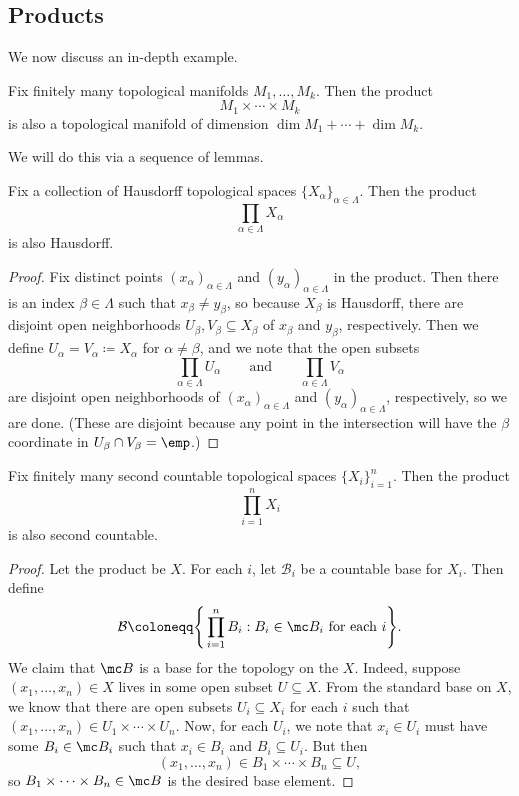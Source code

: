 \documentclass[../notes.tex]{subfiles}
\begin{document}
\subsection{Products}
We now discuss an in-depth example.
\begin{proposition} \label{prop:product-manifold}
	Fix finitely many topological manifolds $M_1,\ldots,M_k$. Then the product
	\[M_1\times\cdots\times M_k\]
	is also a topological manifold of dimension $\dim M_1+\cdots+\dim M_k$.
\end{proposition}
We will do this via a sequence of lemmas.
\begin{lemma} \label{lem:prod-haus}
	Fix a collection of Hausdorff topological spaces $\{X_\alpha\}_{\alpha\in\Lambda}$. Then the product
	\[\prod_{\alpha\in\Lambda}X_\alpha\]
	is also Hausdorff.
\end{lemma}
\begin{proof}
	Fix distinct points $(x_\alpha)_{\alpha\in\Lambda}$ and $(y_\alpha)_{\alpha\in\Lambda}$ in the product. Then there is an index $\beta\in\Lambda$ such that $x_\beta\ne y_\beta$, so because $X_\beta$ is Hausdorff, there are disjoint open neighborhoods $U_\beta,V_\beta\subseteq X_\beta$ of $x_\beta$ and $y_\beta$, respectively. Then we define $U_\alpha=V_\alpha\coloneqq X_\alpha$ for $\alpha\ne\beta$, and we note that the open subsets
	\[\prod_{\alpha\in\Lambda}U_\alpha\qquad\text{and}\qquad\prod_{\alpha\in\Lambda}V_\alpha\]
	are disjoint open neighborhoods of $(x_\alpha)_{\alpha\in\Lambda}$ and $(y_\alpha)_{\alpha\in\Lambda}$, respectively, so we are done. (These are disjoint because any point in the intersection will have the $\beta$ coordinate in $U_\beta\cap V_\beta=\emp$.)
\end{proof}
\begin{lemma} \label{lem:prod-sec-cont}
	Fix finitely many second countable topological spaces $\{X_i\}_{i=1}^n$. Then the product
	\[\prod_{i=1}^nX_i\]
	is also second countable.
\end{lemma}
\begin{proof}
	Let the product be $X$. For each $i$, let $\mathcal B_i$ be a countable base for $X_i$. Then define
	\[\mathcal B\coloneqq\Bigg\{\prod_{i=1}^nB_i:B_i\in\mc B_i\text{ for each }i\Bigg\}.\]
	We claim that $\mc B$ is a base for the topology on the $X$. Indeed, suppose $(x_1,\ldots,x_n)\in X$ lives in some open subset $U\subseteq X$. From the standard base on $X$, we know that there are open subsets $U_i\subseteq X_i$ for each $i$ such that $(x_1,\ldots,x_n)\in U_1\times\cdots\times U_n$. Now, for each $U_i$, we note that $x_i\in U_i$ must have some $B_i\in\mc B_i$ such that $x_i\in B_i$ and $B_i\subseteq U_i$. But then
	\[(x_1,\ldots,x_n)\in B_1\times\cdots\times B_n\subseteq U,\]
	so $B_1\times\cdots\times B_n\in\mc B$ is the desired base element.
\end{proof}
\end{document}
